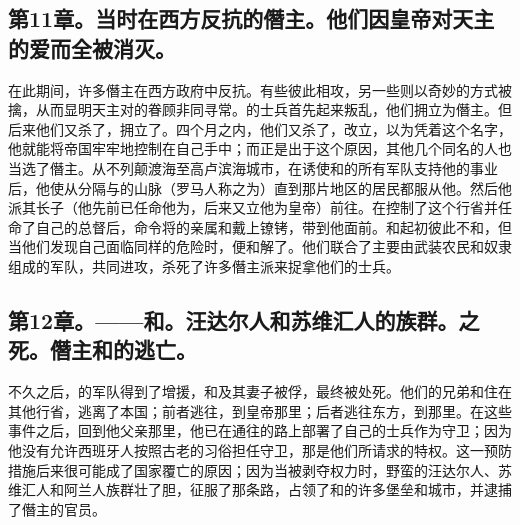 
\subsection{第11章。当时在西方反抗的僭主。他们因皇帝对天主的爱而全被消灭。}

在此期间，许多僭主在西方政府中反抗。有些彼此相攻，另一些则以奇妙的方式被擒，从而显明天主对的眷顾非同寻常。的士兵首先起来叛乱，他们拥立为僭主。但后来他们又杀了，拥立了。四个月之内，他们又杀了，改立，以为凭着这个名字，他就能将帝国牢牢地控制在自己手中；而正是出于这个原因，其他几个同名的人也当选了僭主。从不列颠渡海至高卢滨海城市，在诱使和的所有军队支持他的事业后，他使从分隔与的山脉（罗马人称之为）直到那片地区的居民都服从他。然后他派其长子（他先前已任命他为，后来又立他为皇帝）前往。在控制了这个行省并任命了自己的总督后，命令将的亲属和戴上镣铐，带到他面前。和起初彼此不和，但当他们发现自己面临同样的危险时，便和解了。他们联合了主要由武装农民和奴隶组成的军队，共同进攻，杀死了许多僭主派来捉拿他们的士兵。\par


\subsection{第12章。——和。汪达尔人和苏维汇人的族群。之死。僭主和的逃亡。}

不久之后，的军队得到了增援，和及其妻子被俘，最终被处死。他们的兄弟和住在其他行省，逃离了本国；前者逃往，到皇帝那里；后者逃往东方，到那里。在这些事件之后，回到他父亲那里，他已在通往的路上部署了自己的士兵作为守卫；因为他没有允许西班牙人按照古老的习俗担任守卫，那是他们所请求的特权。这一预防措施后来很可能成了国家覆亡的原因；因为当被剥夺权力时，野蛮的汪达尔人、苏维汇人和阿兰人族群壮了胆，征服了那条路，占领了和的许多堡垒和城市，并逮捕了僭主的官员。\par

